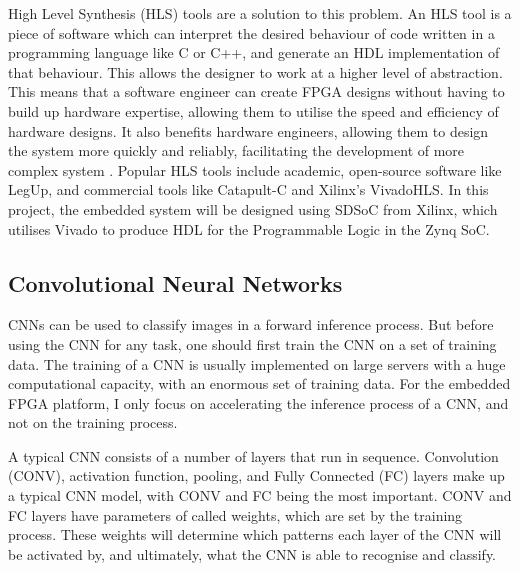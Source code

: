 \documentclass[12pt]{article}
\begin{document}
High Level Synthesis (HLS) tools are a  solution to this problem. An HLS tool is a piece of software which can interpret the desired behaviour of code written in a programming language like C or C++, and generate an HDL implementation of that behaviour. This allows the designer to work at a higher level of abstraction.  This means that a software engineer can create FPGA designs without having to build up hardware expertise, allowing them to utilise the speed and efficiency of hardware designs. It also benefits hardware engineers, allowing them to design the system more quickly and reliably, facilitating the development of more complex system \cite{HLS}. Popular HLS tools include academic, open-source software like LegUp, and commercial tools like Catapult-C and Xilinx's VivadoHLS. In this project, the embedded system will be designed using SDSoC from Xilinx, which utilises Vivado to produce HDL for the Programmable Logic in the Zynq SoC.


\subsection{Convolutional Neural Networks}
\label{sec:Background-CNN}
\vspace{-12pt}

CNNs can be used to classify images in a forward inference process. But before using the CNN for any task, one should first train the CNN on a set of training data. The training of a CNN is usually implemented on large servers with a huge computational capacity, with an enormous set of training data. For the embedded FPGA platform, I only focus on accelerating the inference process of a CNN, and not on the training process.

A typical CNN consists of a number of layers that run in sequence. Convolution (CONV), activation function, pooling, and Fully Connected (FC) layers make up a typical CNN model, with CONV and FC being the most important. CONV and FC layers have parameters of called weights, which are set by the training process. These weights will determine which patterns each layer of the CNN will be activated by, and ultimately, what the CNN is able to recognise and classify. 
\end{document}
